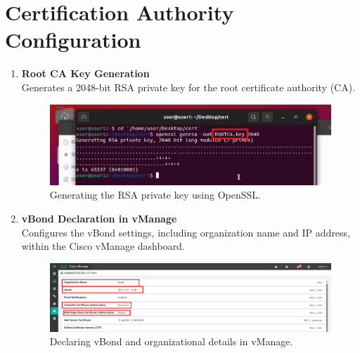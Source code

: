 \documentclass[12pt,english]{report}
\begin{document}
\section{Certification Authority Configuration}

\begin{enumerate}
    \item \textbf{Root CA Key Generation} \\
    Generates a 2048-bit RSA private key for the root certificate authority (CA).
    \begin{figure}[h]
        \centering
        \includegraphics[width=1\textwidth]{appendix/rootca-key.png}
        \caption{Generating the RSA private key using OpenSSL.}
        \label{fig:root-ca-key}
    \end{figure}

    \item \textbf{vBond Declaration in vManage} \\
    Configures the vBond settings, including organization name and IP address, within the Cisco vManage dashboard.
    \begin{figure}[h]
        \centering
        \includegraphics[width=1\textwidth]{appendix/vmanage-settings1.png}
        \caption{Declaring vBond and organizational details in vManage.}
        \label{fig:vbond-config}
    \end{figure}


\end{enumerate}
\end{document}
